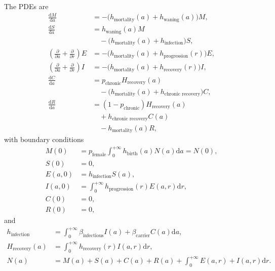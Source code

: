 \documentclass[12pt]{article}
\newcommand{\md}{\mathrm{d}}
\begin{document}
The PDEs are
\begin{equation}
  \begin{split}
    \frac{\md M}{\md a}
    &= - \big(h_{\text{mortality}}(a)
    + h_{\text{waning}}(a)\big) M,
    \\
    \frac{\md S}{\md a}
    &= h_{\text{waning}}(a) M
    \\ & \quad {}
    - \big(h_{\text{mortality}}(a)
      + h_{\text{infection}}
    \big) S,
    \\
    \left(
      \frac{\partial}{\partial a}
      + \frac{\partial}{\partial r}
    \right) E
    &=- \big(h_{\text{mortality}}(a)
    + h_{\text{progression}}(r)\big) E,
    \\
    \left(
      \frac{\partial}{\partial a}
      + \frac{\partial}{\partial r}
    \right) I
    &= - \big(h_{\text{mortality}}(a)
    + h_{\text{recovery}}(r)\big) I,
    \\
    \frac{\md C}{\md a}
    &= p_{\text{chronic}} H_{\text{recovery}}(a)
    \\ & \quad {}
    - \big(h_{\text{mortality}}(a)
    + h_{\text{chronic recovery}}\big) C,
    \\
    \frac{\md R}{\md a}
    &= (1 - p_{\text{chronic}}) H_{\text{recovery}}(a)
    \\ & \quad {}
    + h_{\text{chronic recovery}} C(a)
    \\ & \quad {}
    - h_{\text{mortality}}(a) R,
  \end{split}
\end{equation}
with boundary conditions
\begin{equation}
  \begin{split}
    M(0)
    &= p_{\text{female}}
    \int_0^{+\infty} h_{\text{birth}}(a) N(a) \md a
    = N(0),
    \\
    S(0) &= 0,
    \\
    E(a, 0)
    &= h_{\text{infection}} S(a),
    \\
    I(a, 0)
    &= \int_0^{+\infty}h_{\text{progression}}(r) E(a, r) \md r,
    \\
    C(0) &= 0,
    \\
    R(0) &= 0,
  \end{split}
\end{equation}
and
\begin{equation}
  \begin{split}
    h_{\text{infection}}
    &= \int_0^{+\infty} \beta_{\text{infectious}} I(a)
    + \beta_{\text{carrier}} C(a) \md a,
    \\
    H_{\text{recovery}}(a)
    &= \int_0^{+\infty}h_{\text{recovery}}(r) I(a, r) \md r,
    \\
    N(a) &= M(a) + S(a) + C(a) + R(a)
    + \int_0^{+\infty} E(a, r) + I(a, r) \md r.
  \end{split}
\end{equation}
\end{document}

